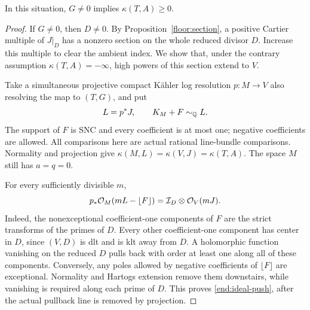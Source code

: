 \begin{proposition}\label{end:boundary-nonvanishing}
In this situation, \(G\ne0\) implies \(\kappa(T,A)\ge0\).
\end{proposition}

\begin{proof}
If \(G\ne0\), then \(D\ne0\). By
Proposition~\ref{floor:section}, a positive Cartier multiple of
\(J|_D\) has a nonzero section on the whole reduced divisor
\(D\). Increase this multiple to clear the ambient index. We show
that, under the contrary assumption \(\kappa(T,A)=-\infty\),
high powers of this section extend to \(V\).

Take a simultaneous projective compact K\"ahler log resolution
\(p:M\to V\) also resolving the map to \((T,G)\), and put
\begin{equation}\label{end:crepant}
 L=p^*J,\qquad K_M+F\sim_{\mathbb{Q}}L.
\end{equation}
The support of \(F\) is SNC and every coefficient is at most one;
negative coefficients are allowed. All comparisons here are actual
rational line-bundle comparisons. Normality and projection give
\(\kappa(M,L)=\kappa(V,J)=\kappa(T,A)\). The space \(M\)
still has \(a=q=0\).

For every sufficiently divisible \(m\),
\begin{equation}\label{end:ideal-push}
 p_*\mathcal{O}_M(mL-\lfloor F\rfloor)
   =\mathcal I_D\otimes\mathcal{O}_V(mJ).
\end{equation}
Indeed, the nonexceptional coefficient-one components of \(F\)
are the strict transforms of the primes of \(D\). Every other
coefficient-one component has center in \(D\), since \((V,D)\)
is dlt and is klt away from \(D\). A holomorphic function vanishing
on the reduced \(D\) pulls back with order at least one along all
of these components. Conversely, any poles allowed by negative
coefficients of \(\lfloor F\rfloor\) are exceptional. Normality
and Hartogs extension remove them downstairs, while vanishing is
required along each prime of \(D\). This proves
\eqref{end:ideal-push}, after the actual pullback line is removed
by projection.


\end{proof}
